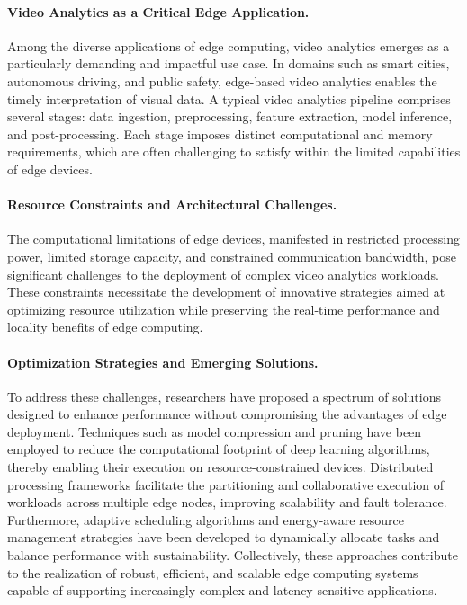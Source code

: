 \paragraph{Video Analytics as a Critical Edge Application.}
Among the diverse applications of edge computing, video analytics emerges as a particularly demanding and impactful use case. In domains such as smart cities, autonomous driving, and public safety, edge-based video analytics enables the timely interpretation of visual data. A typical video analytics pipeline comprises several stages: data ingestion, preprocessing, feature extraction, model inference, and post-processing. Each stage imposes distinct computational and memory requirements, which are often challenging to satisfy within the limited capabilities of edge devices.

\paragraph{Resource Constraints and Architectural Challenges.}
The computational limitations of edge devices, manifested in restricted processing power, limited storage capacity, and constrained communication bandwidth, pose significant challenges to the deployment of complex video analytics workloads. These constraints necessitate the development of innovative strategies aimed at optimizing resource utilization while preserving the real-time performance and locality benefits of edge computing.

\paragraph{Optimization Strategies and Emerging Solutions.}
To address these challenges, researchers have proposed a spectrum of solutions designed to enhance performance without compromising the advantages of edge deployment. Techniques such as model compression and pruning have been employed to reduce the computational footprint of deep learning algorithms, thereby enabling their execution on resource-constrained devices. Distributed processing frameworks facilitate the partitioning and collaborative execution of workloads across multiple edge nodes, improving scalability and fault tolerance. Furthermore, adaptive scheduling algorithms and energy-aware resource management strategies have been developed to dynamically allocate tasks and balance performance with sustainability. Collectively, these approaches contribute to the realization of robust, efficient, and scalable edge computing systems capable of supporting increasingly complex and latency-sensitive applications.


